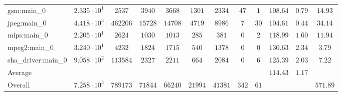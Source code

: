 \begin{tabular}{|l|c|c|c|c|c|c|c|c|c|c|c|}
gsm:main\_0             & $ 2.335 \cdot 10^{1}  $ & $ 2537   $ & $ 3940  $ & $ 3668  $ & $ 1301  $ & $ 2334  $ & $ 47  $ & $ 1  $ & $ 108.64      $ & $ 0.79    $ & $ 14.93   $ \\
jpeg:main\_0            & $ 4.418 \cdot 10^{3}  $ & $ 462206 $ & $ 15728 $ & $ 14708 $ & $ 4719  $ & $ 8986  $ & $ 7   $ & $ 30 $ & $ 104.61      $ & $ 0.44    $ & $ 34.14   $ \\
mips:main\_0            & $ 2.205 \cdot 10^{1}  $ & $ 2624   $ & $ 1030  $ & $ 1013  $ & $ 285   $ & $ 381   $ & $ 0   $ & $ 2  $ & $ 118.99      $ & $ 1.60    $ & $ 11.94   $ \\
mpeg2:main\_0           & $ 3.240 \cdot 10^{1}  $ & $ 4232   $ & $ 1824  $ & $ 1715  $ & $ 540   $ & $ 1378  $ & $ 0   $ & $ 0  $ & $ 130.63      $ & $ 2.34    $ & $ 3.79    $ \\
sha\_driver:main\_0     & $ 9.058 \cdot 10^{2}  $ & $ 113584 $ & $ 2327  $ & $ 2211  $ & $ 664   $ & $ 2084  $ & $ 0   $ & $ 6  $ & $ 125.39      $ & $ 2.03    $ & $ 7.22    $ \\
\hline
Average                 & $                     $ & $        $ & $       $ & $       $ & $       $ & $       $ & $     $ & $    $ & $ 114.43      $ & $ 1.17    $ & $         $ \\
\hline
Overall                 & $ 7.258 \cdot 10^{3}  $ & $ 789173 $ & $ 71844 $ & $ 66240 $ & $ 21994 $ & $ 41381 $ & $ 342 $ & $ 61 $ & $             $ & $         $ & $ 571.89  $ \\
\hline
\end{tabular}
